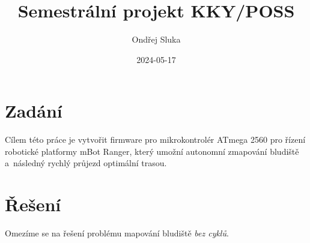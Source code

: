 \documentclass[a4paper,11pt]{article}
\author{Ondřej Sluka}
\date{2024-05-17}
\title{Semestrální projekt KKY/POSS}
\begin{document}
\maketitle
\tableofcontents

\section{Zadání}
Cílem této práce je vytvořit firmware pro mikrokontrolér ATmega 2560 pro řízení
robotické platformy mBot Ranger, který umožní autonomní zmapování bludiště
a~následný rychlý průjezd optimální trasou.

\section{Řešení}
Omezíme se na řešení problému mapování bludiště \emph{bez cyklů}.
\end{document}
